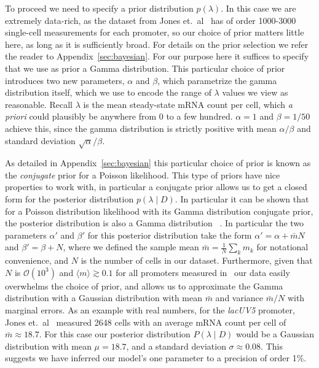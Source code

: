To proceed we need to specify a prior distribution $p(\lambda)$. In this case we
are extremely data-rich, as the dataset from Jones et.\ al~\cite{Jones2014} has
of order 1000-3000 single-cell measurements for each promoter, so our choice of
prior matters little here, as long as it is sufficiently broad. For details on
the prior selection we refer the reader to Appendix~\ref{sec:bayesian}. For our
purpose here it suffices to specify that we use as prior a Gamma distribution.
This particular choice of prior introduces two new parameters, $\alpha$ and
$\beta$, which parametrize the gamma distribution itself, which we use to encode
the range of $\lambda$ values we view as reasonable. Recall $\lambda$ is the
mean steady-state mRNA count per cell, which \textit{a priori} could plausibly
be anywhere from 0 to a few hundred. $\alpha=1$ and $\beta=1/50$ achieve this,
since the gamma distribution is strictly positive with mean $\alpha/\beta$ and
standard deviation $\sqrt{\alpha}/\beta$.

As detailed in Appendix~\ref{sec:bayesian} this particular choice of prior is known
as the \textit{conjugate} prior for a Poisson likelihood. This type of priors
have nice properties to work with, in particular a conjugate prior allows us to
get a closed form for the posterior distribution $p(\lambda \mid D)$. In
particular it can be shown that for a Poisson distribution likelihood with its
Gamma distribution conjugate prior, the posterior distribution is also a Gamma
distribution ~\cite{Gelman2013}. In particular the two parameters $\alpha'$ and
$\beta'$ for this posterior distribution take the form $\alpha' = \alpha +
\bar{m} N$ and $\beta' = \beta + N$, where we defined the sample mean $\bar{m} =
\frac{1}{N}\sum_k m_k$ for notational convenience, and $N$ is the number of
cells in our dataset. Furthermore, given that $N$ is $\mathcal{O}(10^3)$ and
$\langle m\rangle \gtrsim 0.1$ for all promoters measured in~\cite{Jones2014}
our data easily overwhelms the choice of prior, and allows us to approximate the
Gamma distribution with a Gaussian distribution with mean $\bar{m}$ and variance
$\bar{m} / N$ with marginal errors. As an example with real numbers, for the
\textit{lacUV5} promoter, Jones et.\ al~\cite{Jones2014} measured 2648 cells
with an average mRNA count per cell of $\bar{m} \approx 18.7$. For this case our
posterior distribution $P(\lambda \mid D)$ would be a Gaussian distribution with
mean $\mu = 18.7$, and a standard deviation $\sigma \approx 0.08$. This suggests
we have inferred our model's one parameter to a precision of order 1\%.

